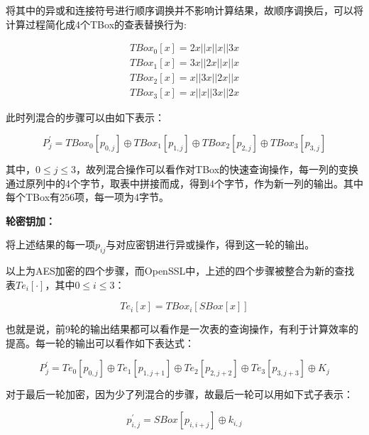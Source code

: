将其中的异或和连接符号进行顺序调换并不影响计算结果，故顺序调换后，可以将计算过程简化成4个TBox的查表替换行为:

\begin{equation}
\begin{array}{l}
	TBo{x_0}[x] = 2x||x||x||3x\\
	TBo{x_1}[x] = 3x||2x||x||x\\
	TBo{x_2}[x] = x||3x||2x||x\\
	TBo{x_3}[x] = x||x||3x||2x
\end{array}
\end{equation}

此时列混合的步骤可以由如下表示：

\begin{equation}
P_j^{'} = TBo{x_0}\left[ {{p_{0,j}}} \right] \oplus TBo{x_1}\left[ {{p_{1,j}}} \right] \oplus TBo{x_2}\left[ {{p_{2,j}}} \right] \oplus TBo{x_3}[{p_{3,j}}]
\end{equation}

其中，$0 \le j \le 3$，故列混合操作可以看作对TBox的快速查询操作，每一列的变换通过原列中的4个字节，取表中拼接而成，得到4个字节，作为新一列的输出。其中每个TBox有256项，每一项为4字节。

\textbf{轮密钥加：}

将上述结果的每一项${p_{ij}}$与对应密钥进行异或操作，得到这一轮的输出。

以上为AES加密的四个步骤，而OpenSSL中，上述的四个步骤被整合为新的查找表$T{e_i}\left[  \cdot  \right]$，其中$0 \le i \le 3$：

\begin{equation}
T{e_i}\left[ x \right] = TBo{x_i}\left[ {SBox\left[ x \right]} \right]
\end{equation}

也就是说，前9轮的输出结果都可以看作是一次表的查询操作，有利于计算效率的提高。每一轮的输出可以看作如下表达式：

\begin{equation}
	P_j^{'} = T{e_0}\left[ {{p_{0,j}}} \right] \oplus T{e_1}\left[ {{p_{1,j + 1}}} \right] \oplus T{e_2}\left[ {{p_{2,j + 2}}} \right] \oplus T{e_3}\left[ {{p_{3,j + 3}}} \right] \oplus {K_j}
\end{equation}

对于最后一轮加密，因为少了列混合的步骤，故最后一轮可以用如下式子表示：

\begin{equation}
	p_{i,j}^{'} = SBox\left[ {{p_{i,i + j}}} \right] \oplus {k_{i,j}}
\end{equation}

